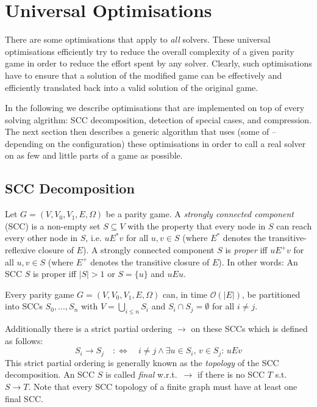 \section{Universal Optimisations}
\label{sec:universal}

There are some optimisations that apply to \emph{all} solvers. These universal optimisations efficiently
try to reduce the overall complexity of a given parity game in order to reduce the effort spent by any solver. 
Clearly, such optimisations have to ensure that a solution of the modified game can be effectively and 
efficiently translated back into a valid solution of the original game.

In the following we describe optimisations that are implemented on top of every solving algrithm:
SCC decomposition, detection of special cases, and compression. The next section then describes a generic
algorithm that uses (some of -- depending on the configuration) these optimisations in order to call
a real solver on as few and little parts of a game as possible.   


\subsection{SCC Decomposition}

Let $G = (V, V_0, V_1, E, \Omega)$ be a parity game. A \emph{strongly connected component} (SCC) is a non-empty set 
$S \subseteq V$ with the property that every node in $S$ can reach every other node in $S$, i.e. $uE^*v$ for 
all $u, v \in S$ (where $E^*$ denotes the transitive-reflexive closure of $E$). A strongly connected component 
$S$ is \emph{proper} iff $uE^+v$ for all $u, v \in S$ (where $E^+$ denotes the transitive closure of $E$). In 
other words: An SCC $S$ is proper iff $|S| > 1$ or $S = \{u\}$ and $uEu$.

\begin{theorem}
Every parity game $G = (V,V_0,V_1,E,\Omega)$ can, in time $\mathcal{O}(|E|)$, be partitioned into SCCs 
$S_0, ..., S_n$ with $V = \bigcup_{i \leq n} S_i$ and $S_i \cap S_j = \emptyset$ for all $i \not= j$.
\end{theorem}

Additionally there is a strict partial ordering $\rightarrow$ on these SCCs which is defined as follows:
\begin{displaymath}
S_i \rightarrow S_j \quad:\iff\quad i \not= j \wedge \exists u \in S_i,\, v \in S_j:\, uEv
\end{displaymath}
This strict partial ordering is generally known as the \emph{topology} of the SCC decomposition. An SCC $S$
is called \emph{final} w.r.t.\ $\to$ if there is no SCC $T$ s.t.\ $S \to T$. Note that every SCC topology
of a finite graph must have at least one final SCC.

